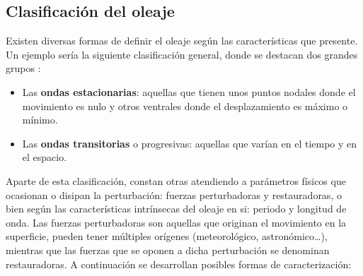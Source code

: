 \subsection{Clasificación del oleaje}\label{header-n60}

Existen diversas formas de definir el oleaje según las características
que presente. Un ejemplo sería la siguiente clasificación general, donde
se destacan dos grandes grupos \cite{fernandez13}:

\begin{itemize}
\item
  Las \textbf{ondas estacionarias}: aquellas que tienen unos puntos
  nodales donde el movimiento es nulo y otros ventrales donde el
  desplazamiento es máximo o mínimo.
\item
  Las \textbf{ondas transitorias} o progresivas: aquellas que varían en
  el tiempo y en el espacio.
\end{itemize}

Aparte de esta clasificación, constan otras atendiendo a parámetros
físicos que ocasionan o disipan la perturbación: fuerzas perturbadoras y
restauradoras, o bien según las características intrínsecas del oleaje
en si: periodo y longitud de onda. Las fuerzas perturbadoras son
aquellas que originan el movimiento en la superficie, pueden tener
múltiples orígenes (meteorológico, astronómico\ldots{}), mientras que
las fuerzas que se oponen a dicha perturbación se denominan
restauradoras. A continuación se desarrollan posibles formas de
caracterización:

